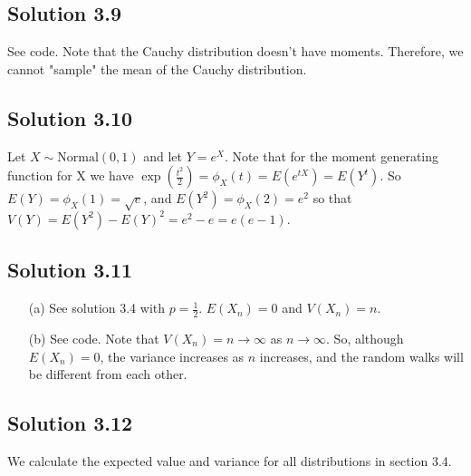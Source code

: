 \subsection*{Solution 3.9}

See code.
Note that the Cauchy distribution doesn't have moments.
Therefore, we cannot "sample" the mean of the Cauchy distribution.


\subsection*{Solution 3.10}

Let $X \sim \mathrm{Normal}(0, 1)$ and let $Y = e^X$.
Note that for the moment generating function for X we have $\exp(\frac{t^2}{2}) = \phi_X(t) = E(e^{tX}) = E(Y^t)$.
So $E(Y) = \phi_X(1) = \sqrt{e}$, and $E(Y^2) = \phi_X(2) = e^2$ so that $V(Y) = E(Y^2) - E(Y)^2 = e^2 - e = e(e - 1)$.


\subsection*{Solution 3.11}

\begin{itemize}
    \item[(a)] See solution 3.4 with $p = \frac{1}{2}$.
        $E(X_n) = 0$ and $V(X_n) = n$.
    \item[(b)] See code.
        Note that $V(X_n) = n \to \infty$ as $n \to \infty$.
        So, although $E(X_n) = 0$, the variance increases as $n$ increases, and the random walks will be different from each other.
\end{itemize}


\subsection*{Solution 3.12}

We calculate the expected value and variance for all distributions in section 3.4.

